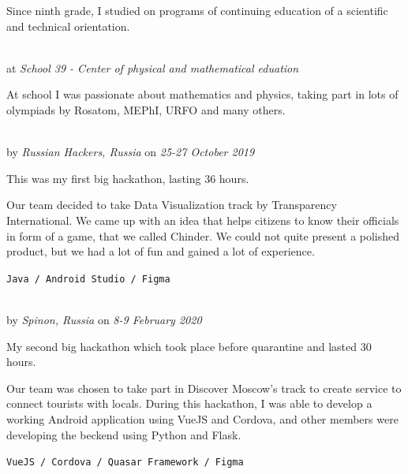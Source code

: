 Since ninth grade, I studied on programs of continuing education of a scientific and technical orientation.

\SmallSep

 \\
at \textit{School 39 - Center of physical and mathematical eduation}
\SmallSep

At school I was passionate about mathematics and physics, taking part in lots of olympiads by Rosatom, MEPhI, URFO and many others.

\Sep


 \\
by \textit{Russian Hackers, Russia}
on \textit{25-27 October 2019}
\SmallSep

This was my first big hackathon, lasting 36 hours.

Our team decided to take Data Visualization track by Transparency
International. We came up with an idea that helps citizens to know their
officials in form of a game, that we called Chinder. We could not quite present
a polished product, but we had a lot of fun and gained a lot of experience.

\texttt{Java / Android Studio / Figma}

\SmallSep

 \\
by \textit{Spinon, Russia}
on \textit{8-9 February 2020}
\SmallSep

My second big hackathon which took place before quarantine and lasted 30 hours.

Our team was chosen to take part in Discover Moscow's track to create service
to connect tourists with locals. During this hackathon, I was able to develop a
working Android application using VueJS and Cordova, and other members were
developing the beckend using Python and Flask.

\texttt{VueJS / Cordova / Quasar Framework / Figma}
